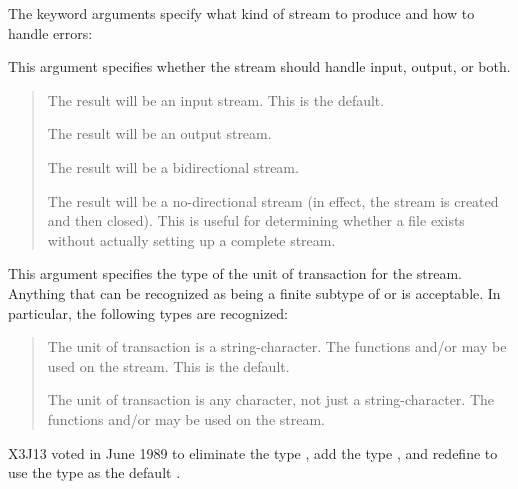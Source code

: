 \begin{defun}[Function]
The keyword arguments specify what kind of stream to produce and how
to handle errors:
\begin{flushdesc}
\item[\cd{:direction}]
This argument specifies whether the stream should handle input, output,
or both.
\begin{quotation}
\begin{flushdesc}
\item[\cd{:input}]
The result will be an input stream.  This is the default.

\item[\cd{:output}]
The result will be an output stream.

\item[\cd{:io}]
The result will be a bidirectional stream.

\item[\cd{:probe}]
The result will be a no-directional stream (in effect, the stream
is created and then closed).  This is useful for determining whether
a file exists without actually setting up a complete stream.
\end{flushdesc}
\end{quotation}

\item[\cd{:element-type}]
This argument specifies the type of the unit of transaction for the stream.
Anything that can be recognized as being a finite subtype of
 or  is acceptable.  In particular,
the following types are recognized:

\begin{obsolete}
\begin{quotation}
\begin{flushdesc}
\item[\cdf{string-char}]
The unit of transaction is a string-character.
The functions  and/or  may be
used on the stream.  This is the default.

\item[\cdf{character}]
The unit of transaction is any character, not just a string-character.
The functions  and/or  may be
used on the stream.
\end{flushdesc}
\end{quotation}
\end{obsolete}

\begin{newer}
X3J13 voted in June 1989 
to eliminate the type , add the type ,
and redefine  to use the type  as the default
.


\end{newer}
\end{flushdesc}
\end{defun}

